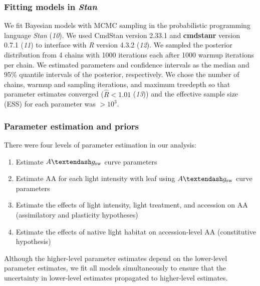 \documentclass[
  letterpaper,
  DIV=11,
  numbers=noendperiod]{scrartcl}
\providecommand{\tightlist}{%
  \setlength{\itemsep}{0pt}\setlength{\parskip}{0pt}}\usepackage{longtable,booktabs,array}
\newcommand{\aax}{$\mathrm{AA}$}
\newcommand{\agcurve}{$A \textendash g_\text{sw}$}
\begin{document}
\subsubsection{\texorpdfstring{Fitting models in
\emph{Stan}}{Fitting models in Stan}}\label{sec-fitting}

We fit Bayesian models with MCMC sampling in the probabilistic
programming language \emph{Stan} (\emph{10}). We used CmdStan version
2.33.1 and \textbf{cmdstanr} version 0.7.1 (\emph{11}) to interface with
\emph{R} version 4.3.2 (\emph{12}). We sampled the posterior
distribution from 4 chains with 1000 iterations each after 1000 warmup
iterations per chain. We estimated parameters and confidence intervals
as the median and 95\% quantile intervals of the posterior,
respectively. We chose the number of chains, warmup and sampling
iterations, and maximum treedepth so that parameter estimates converged
(\(\hat{R} < 1.01\) (\emph{13})) and the effective sample size (ESS) for
each parameter was \(> 10^3\).

\subsubsection{Parameter estimation and
priors}\label{parameter-estimation-and-priors}

There were four levels of parameter estimation in our analysis:

\begin{enumerate}
\def\labelenumi{\arabic{enumi}.}
\tightlist
\item
  Estimate \agcurve{} curve parameters
\item
  Estimate \aax{} for each light intensity with leaf using \agcurve{}
  curve parameters
\item
  Estimate the effects of light intensity, light treatment, and
  accession on \aax{} (assimilatory and plasticity hypotheses)
\item
  Estimate the effects of native light habitat on accession-level \aax{}
  (constitutive hypothesis)
\end{enumerate}

Although the higher-level parameter estimates depend on the lower-level
parameter estimates, we fit all models simultaneously to ensure that the
uncertainty in lower-level estimates propagated to higher-level
estimates.
\end{document}
